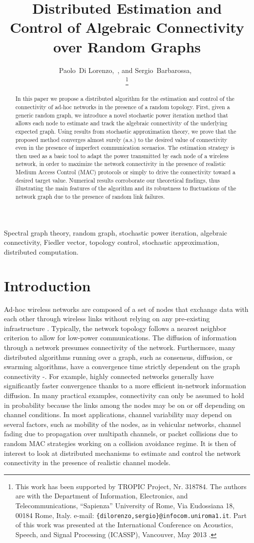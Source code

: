 \documentclass[10pt,twocolumn]{IEEEtran}
\title{Distributed Estimation and Control of Algebraic Connectivity over Random Graphs}
\author{Paolo~Di Lorenzo,~\IEEEmembership{Member,~IEEE}, and Sergio~Barbarossa,~\IEEEmembership{Fellow,~IEEE}\\
\thanks{This work has been supported by TROPIC Project, Nr. 318784. The authors are with the Department of Information, Electronics, and Telecommunications, ``Sapienza'' University of Rome, Via Eudossiana 18, 00184 Rome, Italy. e-mail: {\tt \{dilorenzo,sergio\}@infocom.uniroma1.it}. Part of this work was presented at the International Conference on Acoustics, Speech, and Signal Processing (ICASSP), Vancouver, May 2013 \cite{DiLo_Barb4}.}}
\begin{document}
\maketitle

\begin{abstract}
In this paper we propose a distributed algorithm for the estimation and control of the connectivity of ad-hoc networks in the presence of a random topology. First, given a generic random graph, we introduce a novel stochastic power iteration method that allows each node to estimate and track the algebraic connectivity of the underlying expected graph. Using results from stochastic approximation theory, we prove that the proposed method converges almost surely (a.s.) to the desired value of connectivity even in the presence of imperfect communication scenarios. The estimation strategy is then used as a basic tool to adapt the power transmitted by each node of a wireless network, in order to maximize the network connectivity in the presence of realistic Medium Access Control (MAC) protocols or simply to drive the connectivity toward a desired target value. Numerical results corroborate our theoretical findings, thus illustrating the main features of the algorithm and its robustness to fluctuations of the network graph due to the presence of random link failures.
\end{abstract}

\begin{keywords}
Spectral graph theory, random graph, stochastic power iteration, algebraic connectivity, Fiedler vector, topology control, stochastic approximation, distributed computation.
\end{keywords}

\section{Introduction}

Ad-hoc wireless networks are composed of a set of nodes that exchange data with each other through wireless links without relying on any pre-existing infrastructure \cite{Barb-Sard-Dilo}. Typically, the network topology follows a nearest neighbor criterion to allow for low-power communications.    The diffusion of information through a network presumes connectivity of the network. Furthermore, many distributed algorithms running over a graph, such as consensus, diffusion, or swarming algorithms, have a convergence time strictly dependent on the graph connectivity \cite{Xiao-Boyd}-\cite{DiLo_Barb3}. For example, highly connected networks generally have significantly faster convergence thanks to a more efficient in-network information diffusion.  In many practical examples, connectivity can only be assumed to hold in probability because the links among the nodes may be on or off depending on channel conditions. In most applications, channel variability may depend on several factors, such as mobility of the nodes, as in vehicular networks, channel fading due to propagation over multipath channels, or packet collisions due to random MAC strategies working on a collision avoidance regime. It is then of interest to look at distributed mechanisms to estimate and control the network connectivity in the presence of realistic channel models.
\end{document}
